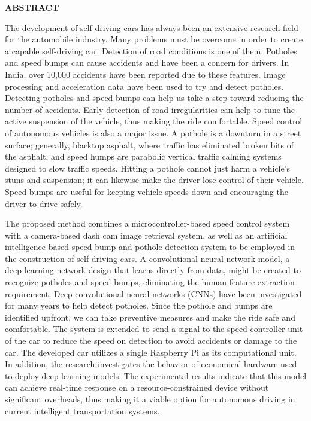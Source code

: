 \begin{center}
    \textsf{\Huge \textbf{ABSTRACT}
    }\\
    
\end{center}
\noindent
The development of self-driving cars has always been an extensive research field for the
automobile industry. Many problems must be overcome in order to create a capable self-driving car. Detection of road conditions is one of them. Potholes and speed bumps can cause accidents and have been a concern for drivers. In India, over 10,000 accidents have been reported due to these features. Image processing and acceleration data have been used to try and detect potholes. Detecting potholes and speed bumps can help us take a step toward reducing the number of accidents. Early detection of road irregularities can help to tune the active suspension of the vehicle, thus making the ride comfortable. Speed control of autonomous vehicles is also a major issue. A pothole is a downturn in a street surface; generally, blacktop asphalt, where traffic has eliminated broken bits of the asphalt, and speed humps are parabolic vertical traffic calming systems designed to slow traffic speeds. Hitting a pothole cannot just harm a vehicle's stuns and suspension; it can likewise make the driver lose control of their vehicle. Speed bumps are
useful for keeping vehicle speeds down and encouraging the driver to drive safely.
\par \noindent
The proposed method combines a microcontroller-based speed control system with a camera-based dash cam image retrieval system, as well as an artificial intelligence-based speed bump and pothole detection system to be employed in the construction of self-driving cars. A convolutional neural network model, a deep learning network design that learns directly from data, might be created to recognize potholes and speed bumps, eliminating the human feature extraction requirement. Deep convolutional neural networks (CNNs) have been investigated for many years to help detect potholes. Since the pothole and bumps are identified upfront, we can take preventive measures and make the ride safe and comfortable. The system is extended to send a signal to the speed controller unit of the car to reduce the speed on detection to avoid accidents or damage to the car. The developed car utilizes a single Raspberry Pi as its computational unit. In addition, the research investigates the behavior of economical hardware used to deploy deep learning models. The experimental results indicate that this model can achieve real-time response on a resource-constrained device without significant overheads, thus making it a viable option for autonomous driving in current intelligent transportation systems.